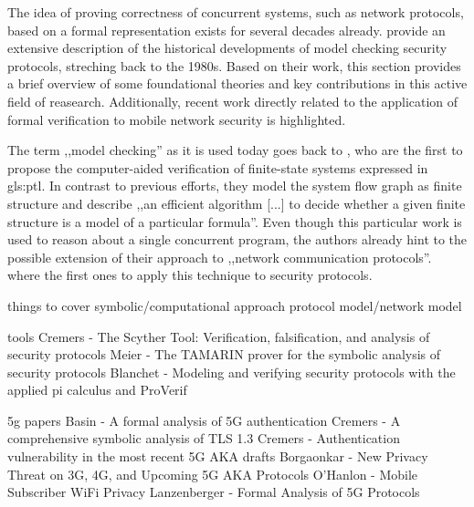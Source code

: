 The idea of proving correctness of concurrent systems, such as network protocols, based on a formal representation exists for several decades already.
\cite{basin2018model} provide an extensive description of the historical developments of model checking security protocols, streching back to the 1980s.
Based on their work, this section provides a brief overview of some foundational theories and key contributions in this active field of reasearch.
Additionally, recent work directly related to the application of formal verification to mobile network security is highlighted.

The term ,,model checking'' as it is used today goes back to \cite{clarke1981design}, who are the first to propose the computer-aided verification of finite-state systems expressed in \gls{gls:ptl}.
In contrast to previous efforts, they model the system flow graph as finite structure and describe ,,an efficient algorithm [...] to decide whether a given finite structure is a model of a particular formula''.
Even though this particular work is used to reason about a single concurrent program, the authors already hint to the possible extension of their approach to ,,network communication protocols''.
\cite{dolev1983security} where the first ones to apply this technique to security protocols.

things to cover
symbolic/computational approach
protocol model/network model

tools
Cremers - The Scyther Tool: Verification, falsification, and analysis of security protocols
Meier - The TAMARIN prover for the symbolic analysis of security protocols
Blanchet - Modeling and verifying security protocols with the applied pi calculus and ProVerif

5g papers
Basin - A formal analysis of 5G authentication
Cremers - A comprehensive symbolic analysis of TLS 1.3
Cremers - Authentication vulnerability in the most recent 5G AKA drafts
Borgaonkar - New Privacy Threat on 3G, 4G, and Upcoming 5G AKA Protocols
O’Hanlon - Mobile Subscriber WiFi Privacy
Lanzenberger - Formal Analysis of 5G Protocols
